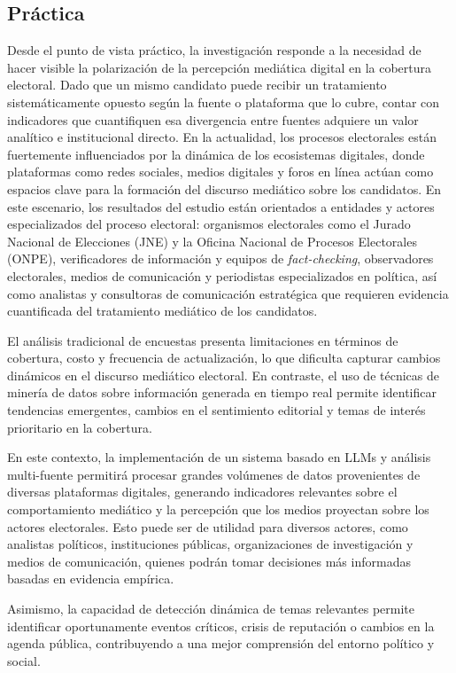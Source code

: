 \subsection{Práctica}

Desde el punto de vista práctico, la investigación responde a la necesidad de hacer visible la polarización de la percepción mediática digital en la cobertura electoral. Dado que un mismo candidato puede recibir un tratamiento sistemáticamente opuesto según la fuente o plataforma que lo cubre, contar con indicadores que cuantifiquen esa divergencia entre fuentes adquiere un valor analítico e institucional directo. En la actualidad, los procesos electorales están fuertemente influenciados por la dinámica de los ecosistemas digitales, donde plataformas como redes sociales, medios digitales y foros en línea actúan como espacios clave para la formación del discurso mediático sobre los candidatos. En este escenario, los resultados del estudio están orientados a entidades y actores especializados del proceso electoral: organismos electorales como el Jurado Nacional de Elecciones (JNE) y la Oficina Nacional de Procesos Electorales (ONPE), verificadores de información y equipos de \textit{fact-checking}, observadores electorales, medios de comunicación y periodistas especializados en política, así como analistas y consultoras de comunicación estratégica que requieren evidencia cuantificada del tratamiento mediático de los candidatos.

El análisis tradicional de encuestas presenta limitaciones en términos de cobertura, costo y frecuencia de actualización, lo que dificulta capturar cambios dinámicos en el discurso mediático electoral. En contraste, el uso de técnicas de minería de datos sobre información generada en tiempo real permite identificar tendencias emergentes, cambios en el sentimiento editorial y temas de interés prioritario en la cobertura.

En este contexto, la implementación de un sistema basado en LLMs y análisis multi-fuente permitirá procesar grandes volúmenes de datos provenientes de diversas plataformas digitales, generando indicadores relevantes sobre el comportamiento mediático y la percepción que los medios proyectan sobre los actores electorales. Esto puede ser de utilidad para diversos actores, como analistas políticos, instituciones públicas, organizaciones de investigación y medios de comunicación, quienes podrán tomar decisiones más informadas basadas en evidencia empírica.

Asimismo, la capacidad de detección dinámica de temas relevantes permite identificar oportunamente eventos críticos, crisis de reputación o cambios en la agenda pública, contribuyendo a una mejor comprensión del entorno político y social.

